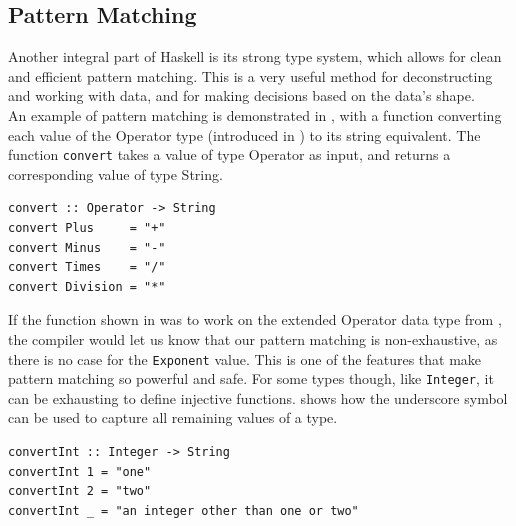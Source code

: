 \subsection{Pattern Matching}

Another integral part of Haskell is its strong type system, which allows for clean and efficient pattern matching. This is a very useful method for deconstructing and working with data, and for making decisions based on the data's shape. \\

An example of pattern matching is demonstrated in , with a function converting each value of the Operator type (introduced in ) to its string equivalent. The function \texttt{convert} takes a value of type Operator as input, and returns a corresponding value of type String. \\

\begin{lstlisting}[caption={Haskell function converting values of one type to another.}, captionpos=b, label={Haskell function converting values of one type to another.}]
convert :: Operator -> String
convert Plus     = "+"
convert Minus    = "-"
convert Times    = "/"
convert Division = "*"
\end{lstlisting}

If the function shown in  was to work on the extended Operator data type from , the compiler would let us know that our pattern matching is non-exhaustive, as there is no case for the \texttt{Exponent} value. This is one of the features that make pattern matching so powerful and safe. For some types though, like \texttt{Integer}, it can be exhausting to define injective functions.  shows how the underscore symbol can be used to capture all remaining values of a type. \\

\begin{lstlisting}[caption={A rather lazy Haskell function attempting to convert values of type Integer to its string equivalent.}, captionpos=b, label={A rather lazy Haskell.}]
convertInt :: Integer -> String
convertInt 1 = "one"
convertInt 2 = "two"
convertInt _ = "an integer other than one or two"
\end{lstlisting}


